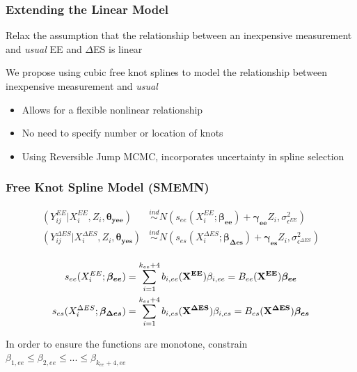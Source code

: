 \documentclass[handout]{beamer}\usepackage[]{graphicx}\usepackage[]{color}
\begin{document}
\begin{frame}
\frametitle{Extending the Linear Model}
Relax the assumption that the relationship between an inexpensive measurement and \emph{usual} EE and $\Delta$ES is linear \\

\vspace{0.5cm}

We propose using cubic free knot splines to model the relationship between inexpensive  measurement and \emph{usual}

\begin{itemize}
\item
Allows for a flexible nonlinear relationship
\item
No need to specify number or location of knots
\item
Using Reversible Jump MCMC, incorporates uncertainty in spline selection

\end{itemize}


\end{frame}


\begin{frame}
\frametitle{Free Knot Spline Model (SMEMN)}

\begin{align*}
  (Y_{ij}^{EE}|X_i^{EE},Z_i,\boldsymbol{\theta_{yee}}) &\overset{ind}{\sim} N(s_{ee}(X_i^{EE};\boldsymbol{\beta_{ee}}) + \boldsymbol{\gamma_{ee}}Z_i,\sigma_{\epsilon^{EE}}^2) \\
    (Y_{ij}^{\Delta ES}|X_i^{\Delta ES},Z_i,\boldsymbol{\theta_{yes}}) &\overset{ind}{\sim} N(s_{es}(X_i^{\Delta ES};\boldsymbol{\beta_{\Delta es}}) + \boldsymbol{\gamma_{es}}Z_i,\sigma_{\epsilon^{\Delta ES}}^2) \\
\end{align*}

\begin{align*}
  s_{ee}(X_i^{EE};\boldsymbol{\beta_{ee}}) &= \sum_{i=1}^{k_{ee}+4} b_{i,ee}({\bf X^{EE}}) \beta_{i,ee} = B_{ee}({\bf X^{EE}}) \boldsymbol{\beta_{ee}}\\
  s_{es}(X_i^{\Delta ES};\boldsymbol{\beta_{\Delta es}}) &= \sum_{i=1}^{k_{es}+4} b_{i,es}({\bf X^{\Delta ES}}) \beta_{i,es} = B_{es}({\bf X^{\Delta ES}}) \boldsymbol{\beta_{es}}
\end{align*}

In order to ensure the functions are monotone, constrain $\beta_{1,ee} \leq \beta_{2,ee} \leq ... \leq \beta_{k_{ee}+4,ee}$ 

% 
% 

\end{frame}
\end{document}
